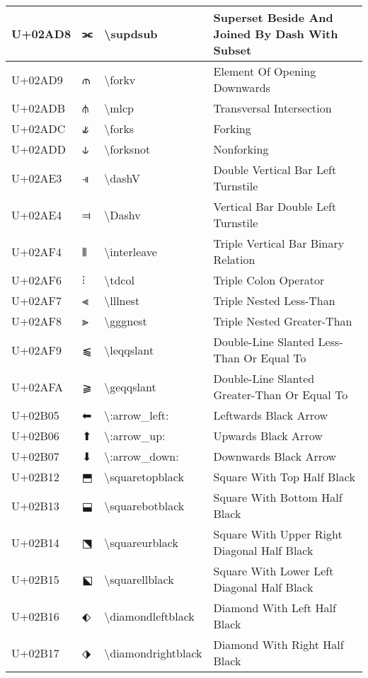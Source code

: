 \begin{table}[h]
\begin{tabulary}{\linewidth}{|L|L|L|L|}
\hline
U+02AD8 & ⫘ & {\textbackslash}supdsub & Superset Beside And Joined By Dash With Subset \\
\hline
U+02AD9 & ⫙ & {\textbackslash}forkv & Element Of Opening Downwards \\
\hline
U+02ADB & ⫛ & {\textbackslash}mlcp & Transversal Intersection \\
\hline
U+02ADC & ⫝̸ & {\textbackslash}forks & Forking \\
\hline
U+02ADD & ⫝ & {\textbackslash}forksnot & Nonforking \\
\hline
U+02AE3 & ⫣ & {\textbackslash}dashV & Double Vertical Bar Left Turnstile \\
\hline
U+02AE4 & ⫤ & {\textbackslash}Dashv & Vertical Bar Double Left Turnstile \\
\hline
U+02AF4 & ⫴ & {\textbackslash}interleave & Triple Vertical Bar Binary Relation \\
\hline
U+02AF6 & ⫶ & {\textbackslash}tdcol & Triple Colon Operator \\
\hline
U+02AF7 & ⫷ & {\textbackslash}lllnest & Triple Nested Less-Than \\
\hline
U+02AF8 & ⫸ & {\textbackslash}gggnest & Triple Nested Greater-Than \\
\hline
U+02AF9 & ⫹ & {\textbackslash}leqqslant & Double-Line Slanted Less-Than Or Equal To \\
\hline
U+02AFA & ⫺ & {\textbackslash}geqqslant & Double-Line Slanted Greater-Than Or Equal To \\
\hline
U+02B05 & ⬅ & {\textbackslash}:arrow\_left: & Leftwards Black Arrow \\
\hline
U+02B06 & ⬆ & {\textbackslash}:arrow\_up: & Upwards Black Arrow \\
\hline
U+02B07 & ⬇ & {\textbackslash}:arrow\_down: & Downwards Black Arrow \\
\hline
U+02B12 & ⬒ & {\textbackslash}squaretopblack & Square With Top Half Black \\
\hline
U+02B13 & ⬓ & {\textbackslash}squarebotblack & Square With Bottom Half Black \\
\hline
U+02B14 & ⬔ & {\textbackslash}squareurblack & Square With Upper Right Diagonal Half Black \\
\hline
U+02B15 & ⬕ & {\textbackslash}squarellblack & Square With Lower Left Diagonal Half Black \\
\hline
U+02B16 & ⬖ & {\textbackslash}diamondleftblack & Diamond With Left Half Black \\
\hline
U+02B17 & ⬗ & {\textbackslash}diamondrightblack & Diamond With Right Half Black \\

\end{tabulary}
\end{table}
